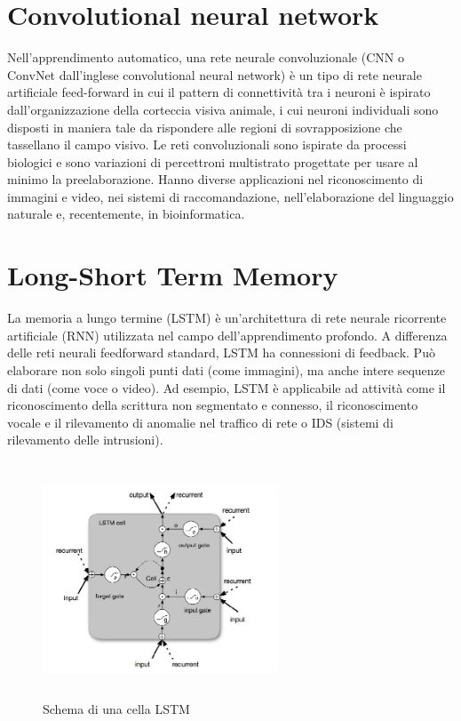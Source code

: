 \documentclass[12pt,a4paper]{report}
\begin{document}
\section*{Convolutional neural network}
\label{appendix:CNN}
Nell'apprendimento automatico, una rete neurale convoluzionale (CNN o ConvNet dall'inglese convolutional neural network) è un tipo di rete neurale artificiale feed-forward in cui il pattern di connettività tra i neuroni è ispirato dall'organizzazione della corteccia visiva animale, i cui neuroni individuali sono disposti in maniera tale da rispondere alle regioni di sovrapposizione che tassellano il campo visivo. Le reti convoluzionali sono ispirate da processi biologici e sono variazioni di percettroni multistrato progettate per usare al minimo la preelaborazione. Hanno diverse applicazioni nel riconoscimento di immagini e video, nei sistemi di raccomandazione, nell'elaborazione del linguaggio naturale e, recentemente, in bioinformatica. \cite{itwiki:122354896}
    
\section*{Long-Short Term Memory}
\label{appendix:LSTM}
La memoria a lungo termine (LSTM) è un'architettura di rete neurale ricorrente artificiale (RNN) utilizzata nel campo dell'apprendimento profondo. A differenza delle reti neurali feedforward standard, LSTM ha connessioni di feedback. Può elaborare non solo singoli punti dati (come immagini), ma anche intere sequenze di dati (come voce o video). Ad esempio, LSTM è applicabile ad attività come il riconoscimento della scrittura non segmentato e connesso, il riconoscimento vocale e il rilevamento di anomalie nel traffico di rete o IDS (sistemi di rilevamento delle intrusioni). \cite{enwiki:1046770680}

\begin{figure}[h!]
    \begin{center}
        \includegraphics[width=7cm,height=7cm,keepaspectratio]{diagram_LSTM}
    \end{center}
    \caption{Schema di una cella LSTM}
    \label{fig:LSTM-schema}
\end{figure}
\end{document}
